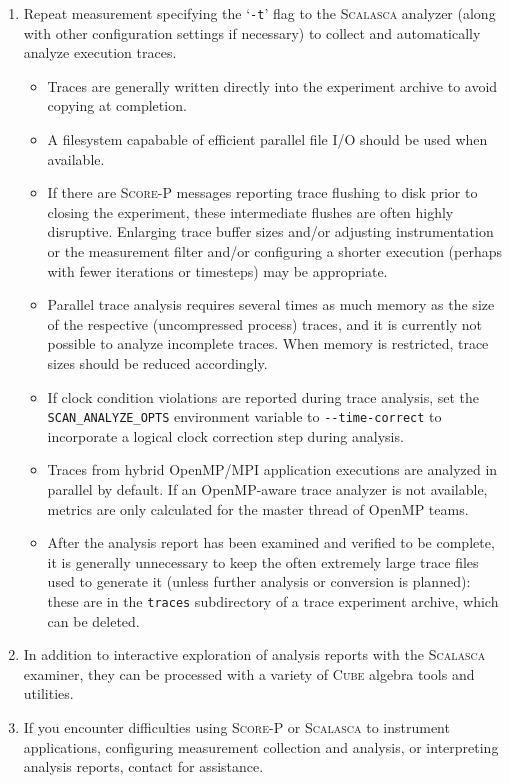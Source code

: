 \documentclass[a4paper]{article}
\newcommand{\Scalasca}{\textsc{Scalasca}\xspace}
\newcommand{\Scorep}{\textsc{Score-P}\xspace}
\newcommand{\Cube}{\textsc{Cube}\xspace}
\begin{document}
\begin{enumerate}
\item Repeat measurement specifying the `\verb+-t+' flag to the
\Scalasca analyzer (along with other configuration settings if
necessary) to collect and automatically analyze execution traces.

\begin{itemize}
\item Traces are generally written directly into the experiment archive to
avoid copying at completion.
\item A filesystem capabable of efficient parallel file I/O should be used when available.
\item If there are \Scorep messages reporting trace flushing to disk prior to
closing the experiment, these intermediate flushes are often highly
disruptive.
Enlarging trace buffer sizes and/or adjusting
instrumentation or the measurement filter and/or configuring a shorter
execution (perhaps with fewer iterations or timesteps) may be appropriate.
\item Parallel trace analysis requires several times as much memory as the
size of the respective (uncompressed process) traces, and it is currently not
possible to analyze incomplete traces.  When memory is restricted,
trace sizes should be reduced accordingly.
\item If clock condition violations are reported during trace
analysis, set the \verb+SCAN_ANALYZE_OPTS+ environment variable to
\verb+--time-correct+ to incorporate a logical clock correction step during
analysis.
\item Traces from hybrid OpenMP/MPI application executions are analyzed
in parallel by default.  If an OpenMP-aware trace analyzer is not available,
metrics are only calculated for the master thread of OpenMP teams.
\item After the analysis report has been examined and verified to be
complete, it is generally unnecessary to keep the often extremely large
trace files used to generate it (unless further analysis or conversion
is planned): these are in the \verb+traces+
subdirectory of a trace experiment archive, which can be deleted.
\end{itemize}

\item In addition to interactive exploration of analysis reports with
the \Scalasca examiner, they can be processed with a variety of
\Cube algebra tools and utilities.

\item If you encounter difficulties using \Scorep or \Scalasca to instrument applications,
configuring measurement collection and analysis, or interpreting
analysis reports, contact \texttt{\PackageBugreport} for assistance.

\end{enumerate}
\end{document}
